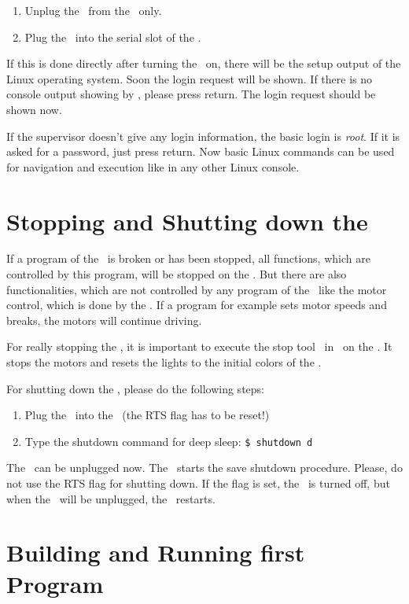 \begin{enumerate}
\item Unplug the \progcable\ from the \diwheel\ only.
\item Plug the \progcable\ into the serial slot of the \cognition.
\end{enumerate}

If this is done directly after turning the \amiro\ on, there will be the setup output of the Linux operating system. Soon the login request will be shown. If there is no console output showing by \gtk, please press return. The login request should be shown now.

If the supervisor doesn't give any login information, the basic login is {\it root}. If it is asked for a password, just press return. Now basic Linux commands can be used for navigation and execution like in any other Linux console.

\section{Stopping and Shutting down the \amiro}
\label{sec:stopshutdown}

If a program of the \cognition\ is broken or has been stopped, all functions, which are controlled by this program, will be stopped on the \cognition. But there are also functionalities, which are not controlled by any program of the \cognition\ like the motor control, which is done by the \diwheel. If a program for example sets motor speeds and breaks, the motors will continue driving.

For really stopping the \amiro, it is important to execute the stop tool \stopnameI\ in \stoppathI\ on the \cognition. It stops the motors and resets the lights to the initial colors of the \light.

For shutting down the \amiro, please do the following steps:
\begin{enumerate}
\item Plug the \progcable\ into the \diwheel\ (the RTS flag has to be reset!)
\item Type the shutdown command for deep sleep: {\tt\$ shutdown d}
\end{enumerate}
The \progcable\ can be unplugged now. The \amiro\ starts the save shutdown procedure. Please, do not use the RTS flag for shutting down. If the flag is set, the \amiro\ is turned off, but when the \progcable\ will be unplugged, the \amiro\ restarts.

\section{Building and Running first Program}
\label{sec:firstprog}


